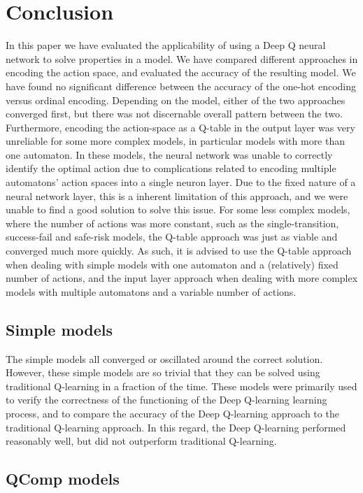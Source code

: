 \newpage
\section{Conclusion}

In this paper we have evaluated the applicability of using a Deep Q neural network to solve properties in a model. We have compared different approaches in encoding the action space, and evaluated the accuracy of the resulting model. We have found no significant difference between the accuracy of the one-hot encoding versus ordinal encoding. Depending on the model, either of the two approaches converged first, but there was not discernable overall pattern between the two. Furthermore, encoding the action-space as a Q-table in the output layer was very unreliable for some more complex models, in particular models with more than one automaton. In these models, the neural network was unable to correctly identify the optimal action due to complications related to encoding multiple automatons' action spaces into a single neuron layer. Due to the fixed nature of a neural network layer, this is a inherent limitation of this approach, and we were unable to find a good solution to solve this issue. For some less complex models, where the number of actions was more constant, such as the single-transition, success-fail and safe-risk models, the Q-table approach was just as viable and converged much more quickly. As such, it is advised to use the Q-table approach when dealing with simple models with one automaton and a (relatively) fixed number of actions, and the input layer approach when dealing with more complex models with multiple automatons and a variable number of actions.

\subsection{Simple models}

The simple models all converged or oscillated around the correct solution. However, these simple models are so trivial that they can be solved using traditional Q-learning in a fraction of the time. These models were primarily used to verify the correctness of the functioning of the Deep Q-learning learning process, and to compare the accuracy of the Deep Q-learning approach to the traditional Q-learning approach. In this regard, the Deep Q-learning performed reasonably well, but did not outperform traditional Q-learning.

\subsection{QComp models}

